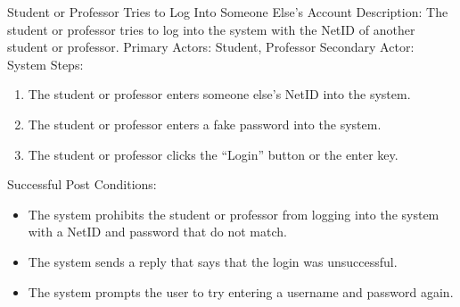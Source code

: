     \begin{section}{Student or Professor Tries to Log Into Someone Else’s Account}
        Description: The student or professor tries to log into the  system with the NetID of another student or professor. \newline
        Primary Actors: Student, Professor \newline
        Secondary Actor: System \newline
        Steps:
        \begin{enumerate}
            \item{The student or professor enters someone else’s NetID into the system.}
            \item{The student or professor enters a fake password into the system.}
            \item{The student or professor clicks the “Login” button or the enter key.}
        \end{enumerate}
        Successful Post Conditions:
        \begin{itemize}
            \item{The system prohibits the student or professor from logging into the system with a NetID and password that do not match.}
            \item{The system sends a reply that says that the login was unsuccessful.}
            \item{The system prompts the user to try entering a username and password again.}
        \end{itemize}
    \end{section}
    
